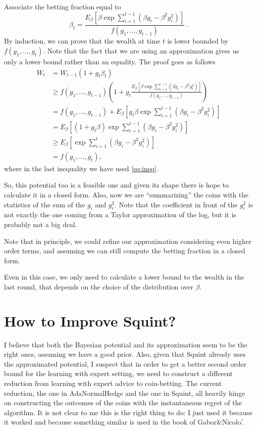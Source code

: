 \documentclass{article}
\begin{document}
Associate the betting fraction equal to
\[
\beta_t = \frac{E_{\beta} \left[\beta \exp \sum_{i=1}^{t-1}(\beta g_i-\beta^2 g_i^2) \right]}{f(g_1, \dots, g_{t-1})}~.
\]
By induction, we can prove that the wealth at time $t$ is lower bounded by $f(g_1, \dots, g_{t})$. Note that the fact that we are using an approximation gives us only a lower bound rather than an equality.
The proof goes as follows
\begin{align*}
W_t
&=W_{t-1}(1+g_t \beta_t) \\
&\geq f(g_1, \dots, g_{t-1})\left(1+g_t \frac{E_\beta[\beta \exp \sum_{i=1}^{t-1}(\beta g_i-\beta^2 g_i^2)]}{f(g_1, \dots, g_{t-1})}\right) \\
&= f(g_1, \dots, g_{t-1})+ E_\beta\left[g_t \beta \exp \sum_{i=1}^{t-1}(\beta g_i-\beta^2 g_i^2)\right] \\
&=E_\beta\left[(1+g_t \beta) \exp \sum_{i=1}^{t-1}(\beta g_i-\beta^2 g_i^2)\right] \\
&\geq E_\beta\left[\exp \sum_{i=1}^{t}(\beta g_i-\beta^2 g_i^2)\right] \\
&= f(g_1, \dots, g_{t}),
\end{align*}
where in the last inequality we have used \eqref{eq:ineq}.

So, this potential too is a feasible one and given its shape there is hope to calculate it in a closed form. Also, now we are ``summarizing'' the coins with the statistics of the sum of the $g_i$ and $g_i^2$. Note that the coefficient in front of the $g_i^2$ is not exactly the one coming from a Taylor approximation of the log, but it is probably not a big deal.

Note that in principle, we could refine our approximation considering even higher order terms, and assuming we can still compute the betting fraction in a closed form.

Even in this case, we only need to calculate a lower bound to the wealth in the last round, that depends on the choice of the distribution over $\beta$.

\section{How to Improve Squint?}

I believe that both the Bayesian potential and its approximation seem to be the right ones, assuming we have a good prior. Also, given that Squint already uses the approximated potential, I suspect that in order to get a better second order bound for the learning with expert setting, we need to construct a different reduction from learning with expert advice to coin-betting. The current reduction, the one in AdaNormalHedge and the one in Squint, all heavily hinge on constructing the outcomes of the coins with the instantaneous regret of the algorithm. It is not clear to me this is the right thing to do: I just used it because it worked and because something similar is used in the book of Gabor\&Nicolo'. 
\end{document}
